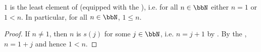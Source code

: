 \begin{lemma} \label{lemma:1_is_least_element_of_natural_numbers}
    $1$ is the least element of  (equipped with the ), i.e. for all $n \in \bbN$ either $n = 1$ or $1 < n$. In particular, for all $n \in \bbN$, $1 \leq n$. 
\end{lemma}
\begin{proof}
    If $n \neq 1$, then  $n$ is $s(j)$ for some $j \in \bbN$, i.e. $n = j+1$ by . By the , $n = 1+j$ and hence $1 < n$. 
\end{proof}